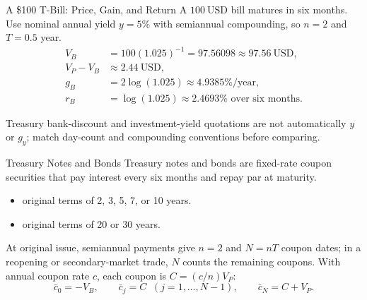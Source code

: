 \documentclass[aspectratio=169,11pt]{beamer}
\begin{document}
\begin{frame}{A \$100 T-Bill: Price, Gain, and Return}
  A $100~\mathrm{USD}$ bill matures in six months. Use nominal annual yield
  $y=5\%$ with semiannual compounding, so $n=2$ and $T=0.5$ year.
  \begin{align*}
    V_B &=100(1.025)^{-1}=97.56098\approx 97.56~\mathrm{USD},\\
    V_P-V_B &\approx 2.44~\mathrm{USD},\\
    g_B &=2\log(1.025)\approx 4.9385\%\text{/year},\\
    r_B &=\log(1.025)\approx 2.4693\%\text{ over six months}.
  \end{align*}


  \vspace{0.45em}
  Treasury bank-discount and investment-yield quotations are not automatically
  $y$ or $g_y$; match day-count and compounding conventions before comparing.

\end{frame}

\begin{frame}{Treasury Notes and Bonds}
  \vspace{0.2em}
  Treasury notes and bonds are fixed-rate coupon securities that pay interest
  every six months and repay par at maturity.

  \vspace{0.45em}
  \begin{itemize}\setlength{\itemsep}{0.35em}
    \item \textbf{} original terms of 2, 3, 5, 7, or 10 years.
    \item \textbf{} original terms of 20 or 30 years.
  \end{itemize}

  \vspace{0.5em}
  At original issue, semiannual payments give $n=2$ and $N=nT$ coupon dates; in
  a reopening or secondary-market trade, $N$ counts the remaining coupons. With
  annual coupon rate $c$, each coupon is $C=(c/n)V_P$:
  \[
    \bar c_0=-V_B,
    \qquad
    \bar c_j=C \;\; (j=1,\ldots,N-1),
    \qquad
    \bar c_N=C+V_P .
  \]

\end{frame}
\end{document}
